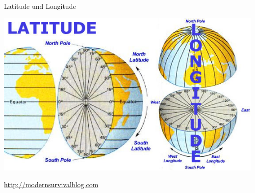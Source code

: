 \documentclass[ignorenonframetext,]{beamer}
\begin{document}
\begin{frame}{Latitude und Longitude}
\protect\hypertarget{latitude-und-longitude}{}

\includegraphics{figure/definition-of-latitude-longitude.jpg}

\href{http://modernsurvivalblog.com/survival-skills/basic-map-reading-latitude-longitude/}{http://modernsurvivalblog.com}

\end{frame}
\end{document}
